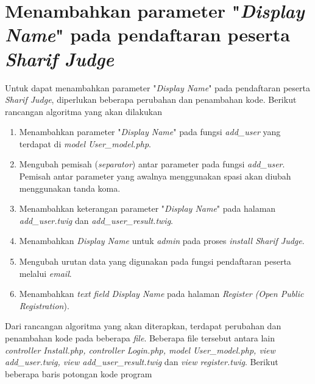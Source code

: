 \section{Menambahkan parameter "\textit{Display Name}" pada pendaftaran peserta \textit{Sharif Judge}}
Untuk dapat menambahkan parameter "\textit{Display Name}" pada pendaftaran peserta \textit{Sharif Judge}, diperlukan beberapa perubahan dan penambahan kode. Berikut rancangan algoritma yang akan dilakukan
\begin{enumerate}
	\item Menambahkan parameter "\textit{Display Name}" pada fungsi \textit{add\_user} yang terdapat di \textit{model User\_model.php}.
	\item Mengubah pemisah (\textit{separator}) antar parameter pada fungsi \textit{add\_user}. Pemisah antar parameter yang awalnya menggunakan spasi akan diubah menggunakan tanda koma.
	\item Menambahkan keterangan parameter "\textit{Display Name}" pada halaman \textit{add\_user.twig} dan  \textit{add\_user\_result.twig}.
	\item Menambahkan \textit{Display Name} untuk \textit{admin} pada proses \textit{install Sharif Judge}.
	\item Mengubah urutan data yang digunakan pada fungsi pendaftaran peserta melalui \textit{email}.
	\item Menambahkan \textit{text field Display Name} pada halaman \textit{Register} \textit{(Open Public Registration}).
\end{enumerate}
Dari rancangan algoritma yang akan diterapkan, terdapat perubahan dan penambahan kode pada beberapa \textit{file}. Beberapa file tersebut antara lain \textit{controller Install.php, controller Login.php, model User\_model.php, view add\_user.twig, view add\_user\_result.twig} dan \textit{view register.twig}.
Berikut beberapa baris potongan kode program


